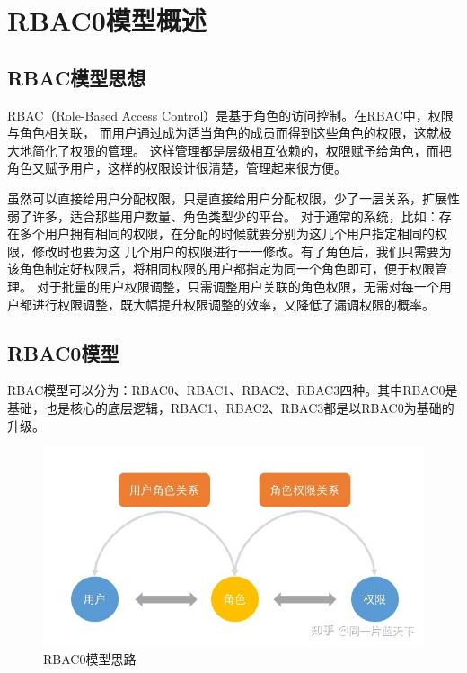 \documentclass[12pt, a4paper, oneside]{ctexart}
\begin{document}
\section{RBAC0模型概述}

\subsection{RBAC模型思想}

RBAC（Role-Based Access Control）是基于角色的访问控制。在RBAC中，权限与角色相关联，
而用户通过成为适当角色的成员而得到这些角色的权限，这就极大地简化了权限的管理。
这样管理都是层级相互依赖的，权限赋予给角色，而把角色又赋予用户，这样的权限设计很清楚，管理起来很方便。

虽然可以直接给用户分配权限，只是直接给用户分配权限，少了一层关系，扩展性弱了许多，适合那些用户数量、角色类型少的平台。
对于通常的系统，比如：存在多个用户拥有相同的权限，在分配的时候就要分别为这几个用户指定相同的权限，修改时也要为这
几个用户的权限进行一一修改。有了角色后，我们只需要为该角色制定好权限后，将相同权限的用户都指定为同一个角色即可，便于权限管理。
对于批量的用户权限调整，只需调整用户关联的角色权限，无需对每一个用户都进行权限调整，既大幅提升权限调整的效率，又降低了漏调权限的概率。

\subsection{RBAC0模型}

RBAC模型可以分为：RBAC0、RBAC1、RBAC2、RBAC3四种。其中RBAC0是基础，也是核心的底层逻辑，RBAC1、RBAC2、RBAC3都是以RBAC0为基础的升级。

\begin{figure}[H]
    \centering
    \includegraphics[width = 1\textwidth]{../pic/1/1.2.jpg}
    \caption{RBAC0模型思路}
\end{figure}
\end{document}
